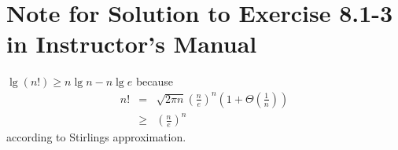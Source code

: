 \documentclass[a4paper, fleqn]{article}
\begin{document}
\section{Note for Solution to Exercise 8.1-3 in Instructor's Manual}

$\lg(n!) \geq n \lg n - n \lg e$ because
\begin{eqnarray*}
n! & = & \sqrt{2 \pi n} \left(\frac{n}{e}\right)^n \left(1 + \Theta\left(\frac{1}{n}\right)\right) \\
   & \geq & \left(\frac{n}{e}\right)^n
\end{eqnarray*}
according to Stirlings approximation.
\end{document}

